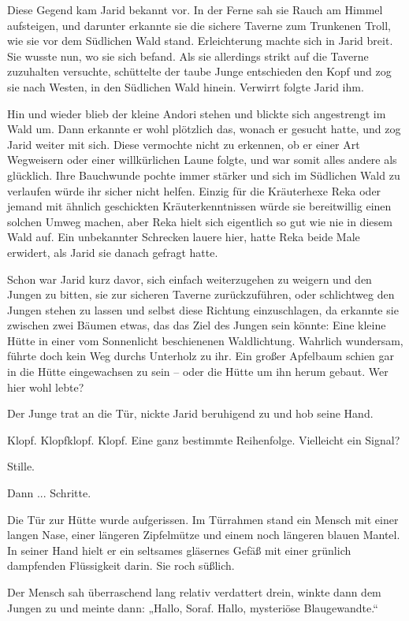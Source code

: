 Diese Gegend kam Jarid bekannt vor. In der Ferne sah sie Rauch am Himmel aufsteigen, und darunter erkannte sie die sichere Taverne zum Trunkenen Troll, wie sie vor dem Südlichen Wald stand. Erleichterung machte sich in Jarid breit. Sie wusste nun, wo sie sich befand. Als sie allerdings strikt auf die Taverne zuzuhalten versuchte, schüttelte der taube Junge entschieden den Kopf und zog sie nach Westen, in den Südlichen Wald hinein. Verwirrt folgte Jarid ihm.

Hin und wieder blieb der kleine Andori stehen und blickte sich angestrengt im Wald um. Dann erkannte er wohl plötzlich das, wonach er gesucht hatte, und zog Jarid weiter mit sich. Diese vermochte nicht zu erkennen, ob er einer Art Wegweisern oder einer willkürlichen Laune folgte, und war somit alles andere als glücklich. Ihre Bauchwunde pochte immer stärker und sich im Südlichen Wald zu verlaufen würde ihr sicher nicht helfen. Einzig für die Kräuterhexe Reka oder jemand mit ähnlich geschickten Kräuterkenntnissen würde sie bereitwillig einen solchen Umweg machen, aber Reka hielt sich eigentlich so gut wie nie in diesem Wald auf. Ein unbekannter Schrecken lauere hier, hatte Reka beide Male erwidert, als Jarid sie danach gefragt hatte.

Schon war Jarid kurz davor, sich einfach weiterzugehen zu weigern und den Jungen zu bitten, sie zur sicheren Taverne zurückzuführen, oder schlichtweg den Jungen stehen zu lassen und selbst diese Richtung einzuschlagen, da erkannte sie zwischen zwei Bäumen etwas, das das Ziel des Jungen sein könnte: Eine kleine Hütte in einer vom Sonnenlicht beschienenen Waldlichtung. Wahrlich wundersam, führte doch kein Weg durchs Unterholz zu ihr. Ein großer Apfelbaum schien gar in die Hütte eingewachsen zu sein – oder die Hütte um ihn herum gebaut. Wer hier wohl lebte?

Der Junge trat an die Tür, nickte Jarid beruhigend zu und hob seine Hand.

Klopf. Klopfklopf. Klopf. Eine ganz bestimmte Reihenfolge. Vielleicht ein Signal?

Stille.

Dann ... Schritte.

Die Tür zur Hütte wurde aufgerissen. Im Türrahmen stand ein Mensch mit einer langen Nase, einer längeren Zipfelmütze und einem noch längeren blauen Mantel. In seiner Hand hielt er ein seltsames gläsernes Gefäß mit einer grünlich dampfenden Flüssigkeit darin. Sie roch süßlich.

Der Mensch sah überraschend lang relativ verdattert drein, winkte dann dem Jungen zu und meinte dann: „Hallo, Soraf. Hallo, mysteriöse Blaugewandte.“

